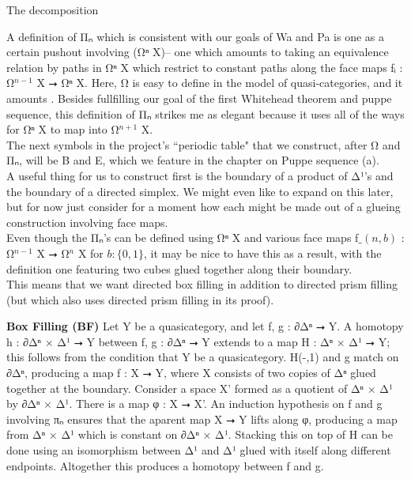 \documentclass{book}
\theoremstyle{definition}
\begin{document}
The decomposition 

A definition of Π⃗ₙ which is consistent with our goals of Wa and Pa is one as a certain pushout involving (Ω⃗ⁿ X)-- one which amounts to taking an equivalence relation by paths in Ω⃗ⁿ X which restrict to constant paths along the face maps fᵢ : Ω⃗${}^{n-1}$ X ⭢ Ω⃗ⁿ X. Here, Ω⃗ is easy to define in the model of quasi-categories, and it amounts . Besides fullfilling our goal of the first Whitehead theorem and puppe sequence, this definition of Π⃗ₙ strikes me as elegant because it uses all of the ways for Ω⃗ⁿ X to map into Ω⃗${}^{n+1}$ X.\\

The next symbols in the project's ``periodic table" that we construct, after Ω⃗ and Π⃗ₙ, will be B⃗ and E⃗, which we feature in the chapter on Puppe sequence (a).\\

A useful thing for us to construct first is the boundary of a product of Δ¹'s and the boundary of a directed simplex. We might even like to expand on this later, but for now just consider for a moment how each might be made out of a glueing construction involving face maps.\\

Even though the Π⃗ₙ's can be defined using Ω⃗ⁿ X and various face maps f$\_(n,b)$ : Ω⃗${}^{n-1}$ X ⭢ Ω⃗${}^{n}$ X for $b : \{ 0, 1 \}$, it may be nice to have this as a result, with the definition one featuring two cubes glued together along their boundary.\\

This means that we want directed box filling in addition to directed prism filling (but which also uses directed prism filling in its proof).

{\bf Box Filling (BF)} Let Y be a quasicategory, and let f, g : ∂Δⁿ ⭢ Y. A homotopy h : ∂Δⁿ × Δ¹ ⭢ Y between f, g : ∂Δⁿ ⭢ Y extends to a map H : Δⁿ × Δ¹ ⭢ Y; this follows from the condition that Y be a quasicategory. H(-,1) and g match on ∂Δⁿ, producing a map f : X ⭢ Y, where X consists of two copies of Δⁿ glued together at the boundary. Consider a space X' formed as a quotient of Δⁿ × Δ¹ by ∂Δⁿ × Δ¹. There is a map φ : X ⭢ X'. An induction hypothesis on f and g involving πₙ ensures that the aparent map X ⭢ Y lifts along φ, producing a map from Δⁿ × Δ¹ which is constant on ∂Δⁿ × Δ¹. Stacking this on top of H can be done using an isomorphism between Δ¹ and Δ¹ glued with itself along different endpoints. Altogether this produces a homotopy between f and g.\\
\end{document}
